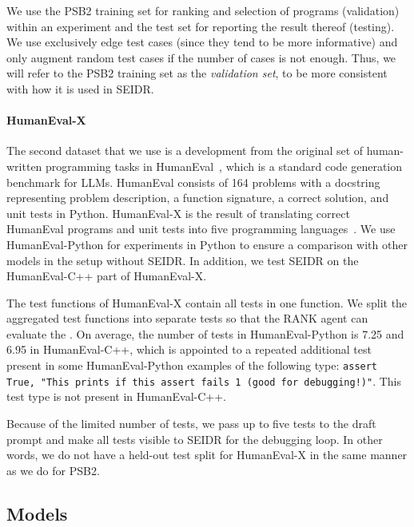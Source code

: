 We use the PSB2 training set for ranking and selection of programs (validation) within an experiment and the test set for reporting the result thereof (testing).
We use exclusively edge test cases (since they tend to be more informative) and only augment random test cases if the number of cases is not enough.
Thus, we will refer to the PSB2 training set as the \emph{validation set}, to be more consistent with how it is used in SEIDR.

\paragraph{HumanEval-X}
The second dataset that we use is a development from the original set of human-written programming tasks in HumanEval~\cite{chenEvaluatingLargeLanguage2021}, which is a standard code generation benchmark for LLMs.
HumanEval consists of 164 problems with a docstring representing problem description, a function signature, a correct solution, and unit tests in Python. 
HumanEval-X is the result of translating correct HumanEval programs and unit tests into five programming languages~\cite{zheng2023:codegeex}. 
We use HumanEval-Python for experiments in Python to ensure a comparison with other models in the setup without SEIDR. 
In addition, we test SEIDR on the HumanEval-C++ part of HumanEval-X. %

The test functions of HumanEval-X contain all tests in one function. We split the aggregated test functions into separate tests so that the RANK agent can evaluate the . 
On average, the number of tests in HumanEval-Python is 7.25 and 6.95 in HumanEval-C++, which is appointed to a repeated additional test present in some HumanEval-Python examples of the following type: \texttt{assert True, "This prints if this assert fails 1 (good for debugging!)"}.
This test type is not present in HumanEval-C++.

Because of the limited number of tests, we pass up to five tests to the draft prompt and make all tests visible to SEIDR for the debugging loop. 
In other words, we do not have a held-out test split for HumanEval-X in the same manner as we do for PSB2.


\newpage\subsection{Models}
\label{sec:seidr-models}

